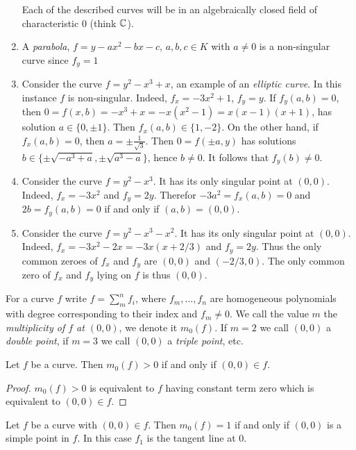     \begin{example}
        \begin{enumerate}
            Each of the described curves will be in an algebraically closed field of characteristic $0$ (think $\mathbb{C}$).
            \item A \textit{parabola}, $f=y-ax^2-bx-c$, $a,b,c\in K$ with $a\neq 0$ is a non-singular curve since $f_y = 1$
            \item Consider the curve $f = y^2-x^3+x$, an example of an \textit{elliptic curve}. In this instance $f$ is non-singular. Indeed, $f_x = -3x^2+1$, $f_y = y$. If $f_y(a,b) = 0$, then $0=f(x,b)=-x^3+x=-x(x^2-1)=x(x-1)(x+1)$, has solution $a\in\{0,\pm 1\}$. Then $f_x(a,b)\in \{1,-2\}$. On the other hand, if $f_x(a,b)=0$, then $a=\pm \frac{1}{\sqrt{3}}$. Then $0=f(\pm a,y)$ has solutions $b\in \{\pm \sqrt{-a^3+a},\pm \sqrt{a^3-a}\}$, hence $b\neq 0$. It follows that $f_y(b)\neq 0$.
            \item Consider the curve $f = y^2-x^3$. It has its only singular point at $(0,0)$. Indeed, $f_x = -3x^2$ and $f_y = 2y$. Therefor $-3a^2=f_x(a,b)=0$ and $2b= f_y(a,b) =0$ if and only if $(a,b) = (0,0)$. 
            \item Consider the curve $f= y^2-x^3-x^2$. It has its only singular point at $(0,0)$. Indeed, $f_x = -3x^2-2x = -3x(x+2/3)$ and $f_y = 2y$. Thus the only common zeroes of $f_x$ and $f_y$ are $(0,0)$ and $(-2/3,0)$. The only common zero of $f_x$ and $f_y$ lying on $f$ is thus $(0,0)$. 
        \end{enumerate}
    \end{example}
    \begin{definition}
        For a curve $f$ write $f=\sum_m^n f_i$, where $f_m,\dots,f_n$ are homogeneous polynomials with degree corresponding to their index and $f_m\neq 0$. We call the value $m$ the \textit{multiplicity of $f$ at $(0,0)$}, we denote it $m_0(f)$. If $m=2$ we call $(0,0)$ a \textit{double point}, if $m=3$ we call $(0,0)$ a \textit{triple point}, etc. 
    \end{definition}
    \begin{lemma}
        Let $f$ be a curve. Then $m_0(f)>0$ if and only if $(0,0)\in f$. 
    \end{lemma}
    \begin{proof}
        $m_0(f)>0$ is equivalent to $f$ having constant term zero which is equivalent to $(0,0)\in f$. 
    \end{proof}
    \begin{lemma}\label{EquivalentFormulationOfSimplePoint}
        Let $f$ be a curve with $(0,0)\in f$. Then $m_0(f) = 1$ if and only if $(0,0)$ is a simple point in $f$. In this case $f_1$ is the tangent line at $0$.
    \end{lemma}
